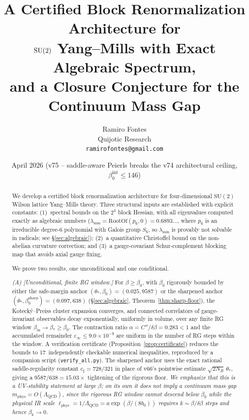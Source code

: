 \documentclass[11pt]{article}
\title{A Certified Block Renormalization Architecture for\\
$\SU(2)$ Yang--Mills with Exact Algebraic Spectrum,\\
and a Closure Conjecture for the Continuum Mass Gap}
\author{Ramiro Fontes\\Quijotic Research\\\texttt{ramirofontes@gmail.com}}
\date{April 2026 (v75 -- saddle-aware Peierls breaks the v74 architectural ceiling, $\beta_0^{\mathrm{int}}\le 146$)}
\theoremstyle{definition}
\newcommand{\SU}{\mathrm{SU}}
\newcommand{\Lam}{\Lambda_{\mathrm{QCD}}}
\begin{document}
\maketitle

\begin{abstract}
We develop a certified block renormalization architecture for
four-dimensional $\SU(2)$ Wilson lattice Yang--Mills theory.
Three structural inputs are established with explicit constants:
(1)~spectral bounds on the $2^4$ block Hessian, with all
eigenvalues computed exactly as algebraic numbers
($\lambda_{\min}=\mathrm{RootOf}(p_6,0)=0.6893\ldots$, where
$p_6$ is an irreducible degree-6 polynomial with Galois group
$S_6$, so $\lambda_{\min}$ is provably not solvable in radicals;
see \S\ref{sec:algebraic});
(2)~a quantitative Christoffel bound on the non-abelian curvature
correction; and (3)~a gauge-covariant Schur-complement blocking
map that avoids axial gauge fixing.

We prove two results, one unconditional and one conditional.

\smallskip\noindent
\emph{(A) [Unconditional, finite RG window.]}
For $\beta\ge\beta_0$, with $\beta_0$ rigorously bounded by either
the safe-margin anchor $(\theta_*,\beta_0) = (0.025, 9587)$ or the
sharpened anchor $(\theta_*,\beta_0^{\mathrm{sharp}}) = (0.097, 638)$
(\S\ref{sec:algebraic}, Theorem~\ref{thm:sharp-floor}), the
Koteck\'y--Preiss cluster expansion converges, and connected
correlators of gauge-invariant observables decay exponentially,
uniformly in volume, over any finite RG window
$\beta_{\mathrm{in}}\to\beta_*\ge\beta_0$.
The contraction ratio $\alpha=C''/\delta\beta=0.283<1$ and the
accumulated remainder $\varepsilon_\infty\le 9.0\times 10^{-9}$
are uniform in the number of RG steps within the window.
A verification certificate
(Proposition~\ref{prop:certificate}) reduces the bounds to
17~independently checkable numerical inequalities, reproduced
by a companion script (\texttt{verify\_all.py}).  The sharpened
anchor uses the exact rational saddle-regularity constant
$c_\sharp=728/321$ in place of v66's pointwise estimate
$\sqrt{2N_B}\,\theta_*$, giving a $9587/638 = 15.03\times$
tightening of the rigorous floor.
\emph{We emphasize that this is a UV-stability statement at large
$\beta$; on its own it does not imply a continuum mass gap
$m_{\mathrm{phys}}=O(\Lam)$, since the rigorous RG window cannot
descend below $\beta_0$ while the physical IR scale
$\ell_{\mathrm{phys}}=1/\Lam=a\exp(\beta/(8b_0))$ requires
$k\sim\beta/\delta\beta$ steps and hence $\beta_k\to 0$.}


\end{abstract}
\end{document}
